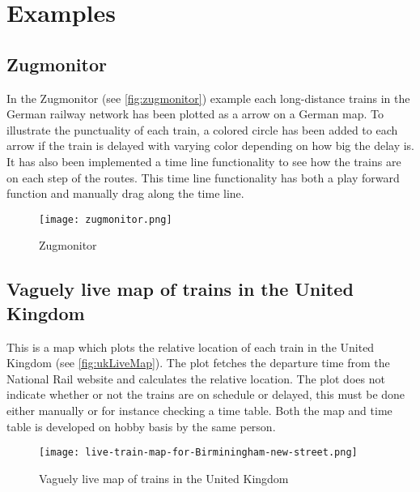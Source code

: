 \pagebreak
\section{Examples}
\label{section:backgroundExamples}

\subsection{Zugmonitor}
\label{subsection:zugmonitor}

In the Zugmonitor (see \vref{fig:zugmonitor}) example each long-distance 
trains in the German railway network has been plotted as a arrow on a German 
map. To illustrate the punctuality of each train, a colored circle has been 
added to each arrow if the train is delayed with varying color depending on 
how big the delay is. It has also been implemented a time line functionality 
to see how the trains are on each step of the routes. This time line 
functionality has both a play forward function and manually drag along the 
time line.

\begin{figure}[!htbp]
	\texttt{[image: zugmonitor.png]}
	\caption[Zugmonitor]{Zugmonitor \cite{zugmonitor}}
	\label{fig:zugmonitor}
\end{figure}
\pagebreak

\subsection{Vaguely live map of trains in the United Kingdom}
\label{subsection:ukLiveMap}

This is a map which plots the relative location of each train in the United
Kingdom (see \vref{fig:ukLiveMap}). The plot fetches the departure time from the 
National Rail website and calculates the relative location. The plot does not
indicate whether or not the trains are on schedule or delayed, this must be
done either manually or for instance checking a time table\cite{trainTimesUK}.
Both the map and time table is developed on hobby basis by the same person. 

\begin{figure}[!htbp]
	\texttt{[image: live-train-map-for-Birminingham-new-street.png]}
	\caption[Vaguely live map of trains in the United Kingdom]{Vaguely live map of trains in the United Kingdom \cite{ukLiveMap}}
	\label{fig:ukLiveMap}
\end{figure}
\pagebreak

